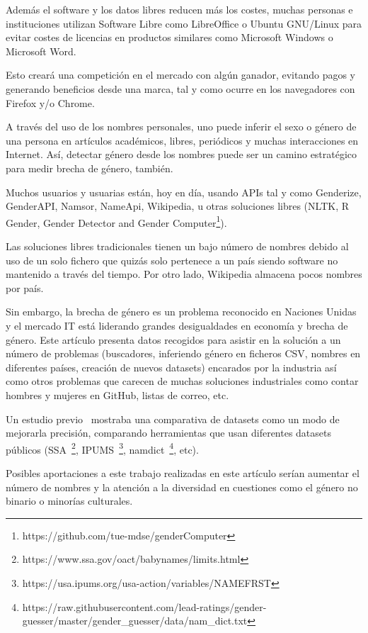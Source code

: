 \documentclass[a4paper]{article}
\begin{document}
Además el software y los datos libres reducen más los costes, muchas personas
e instituciones utilizan Software Libre como LibreOffice o Ubuntu
GNU/Linux para evitar costes de licencias en productos similares
como Microsoft Windows o Microsoft Word.

Esto creará una competición en el mercado con algún ganador, evitando
pagos y generando beneficios desde una marca, tal y como ocurre en los
navegadores con Firefox y/o Chrome.

A través del uso de los nombres personales, uno puede inferir el sexo
o género de una persona en artículos académicos, libres, periódicos y muchas
interacciones en Internet. Así, detectar género desde los nombres puede
ser un camino estratégico para medir brecha de género, también.

Muchos usuarios y usuarias están, hoy en día, usando APIs tal y como
Genderize, GenderAPI, Namsor, NameApi, Wikipedia, u otras soluciones libres
(NLTK\cite{loper2002nltk}, R Gender, Gender Detector and Gender
Computer\footnote{https://github.com/tue-mdse/genderComputer}).

Las soluciones libres tradicionales tienen un bajo número de nombres debido
al uso de un solo fichero que quizás solo pertenece a un país siendo
software no mantenido a través del tiempo. Por otro lado, Wikipedia
almacena pocos nombres por país.

Sin embargo, la brecha de género es un problema reconocido en Naciones
Unidas y el mercado IT está liderando grandes desigualdades en economía
y brecha de género. Este artículo presenta datos recogidos para asistir
en la solución a un número de problemas (buscadores, inferiendo género en
ficheros CSV, nombres en diferentes países, creación de nuevos datasets)
encarados por la industria así como otros problemas que carecen de muchas
soluciones industriales como contar hombres y mujeres en GitHub, listas
de correo, etc.

Un estudio previo~\cite{karimi2016inferring} mostraba una comparativa de
datasets como un modo de mejorarla precisión, comparando herramientas que
usan diferentes datasets públicos
(SSA~\footnote{https://www.ssa.gov/oact/babynames/limits.html},
IPUMS~\footnote{https://usa.ipums.org/usa-action/variables/NAMEFRST},
namdict~\footnote{https://raw.githubusercontent.com/lead-ratings/gender-guesser/master/gender\_guesser/data/nam\_dict.txt},
etc).

Posibles aportaciones a este trabajo realizadas en este artículo
serían aumentar el número de nombres y la atención a la diversidad en
cuestiones como el género no binario o minorías culturales.
\end{document}
